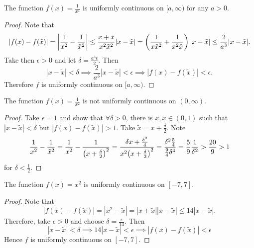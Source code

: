 \documentclass[../notes.tex]{subfiles}
\begin{document}
\begin{example}
    The function $f(x) = \frac{1}{x^2}$ is uniformly continuous on $[a, \infty)$ for any $a > 0$.
    \begin{proof}
        Note that
        \[
            |f(x) - f(\tilde{x})| = \qty|\frac{1}{x^2} - \frac{1}{\tilde{x}^2}| \leq 
            \frac{x + \tilde{x}}{x^2 \tilde{x}^2} |x- \tilde{x}| =
            \qty(\frac{1}{x \tilde{x}^2} + \frac{1}{x^2 \tilde{x}}) |x- \tilde{x}| 
            \leq \frac{2}{a^3} |x-\tilde{x}|
        .\]
        Take then $\epsilon > 0$ and let $\delta = \frac{a^3 \epsilon}{2}$. Then
        \[
            |x - \tilde{x}| < \delta \implies \frac{2}{a^3}|x-\tilde{x}| < \epsilon \implies |f(x) - f(\tilde{x})| < \epsilon
        .\]
        Therefore $f$ is uniformly continuous on $[a,\infty)$.
    \end{proof}
\end{example}

\begin{example}
    The function $f(x) = \frac{1}{x^2}$ is not uniformly continuous on $(0, \infty)$.
    \begin{proof}
        Take $\epsilon = 1$ and show that $\forall \delta > 0$, there is $x,\tilde{x} \in (0,1)$ such that $|x - \tilde{x}| < \delta$ but $|f(x) - f(\tilde{x})| > 1$. Take $\tilde{x} = x + \frac{\delta}{2}$. Note
        \[
            \frac{1}{x^2} - \frac{1}{\tilde{x}^2} = \frac{1}{x^2} - \frac{1}{\qty(x + \frac{\delta}{2})^2} = \frac{\delta x+ \frac{\delta^2}{4}}{x^2 \qty(x + \frac{\delta}{2})^2}= \frac{\delta^2 \frac{5}{4}}{\frac{9}{4} \delta^4} = \frac{5}{9} \frac{1}{\delta^2} > \frac{20}{9} > 1
        \]
        for $\delta < \frac{1}{2}$.
    \end{proof}
\end{example}

\begin{example}
    The function $f(x) = x^2$ is uniformly continuous on $[-7, 7]$.
    \begin{proof}
        Note that
        \[
            |f(x) - f(\tilde{x})| = |x^2 - \tilde{x}| = |x + \tilde{x}||x-\tilde{x}| \leq 14 |x - \tilde{x}|
        .\]
        Therefore, take $\epsilon > 0$ and choose $\delta = \frac{\epsilon}{14}$. Then
        \[
            |x - \tilde{x}| < \delta \implies 14 |x - \tilde{x}| < \epsilon \implies |f(x) - f(\tilde{x})| < \epsilon
        \]
        Hence $f$ is uniformly continuous on $[-7, 7]$.
    \end{proof}
\end{example}
\end{document}
